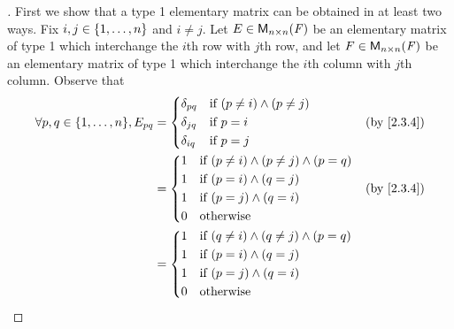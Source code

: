 \begin{proof}[]
  First we show that a type 1 elementary matrix can be obtained in at least two ways.
  Fix \(i, j \in \left\lbrace1, \dots, n\right\rbrace\) and \(i \neq j\).
  Let \(E \in \ms[n][n][\F]\) be an elementary matrix of type 1 which interchange the \(i\)th row with \(j\)th row, and let \(F \in \ms[n][n][\F]\) be an elementary matrix of type 1 which interchange the \(i\)th column with \(j\)th column.
  Observe that
  \begin{align*}
    \forall p, q \in \set{1, \dots, n}, E_{p q} & = \begin{dcases}
                                                      \delta_{p q} & \text{if } (p \neq i) \land (p \neq j) \\
                                                      \delta_{j q} & \text{if } p = i                       \\
                                                      \delta_{i q} & \text{if } p = j
                                                    \end{dcases}    &  & \by{2.3.4}    \\
                                                & = \begin{dcases}
                                                      1 & \text{if } (p \neq i) \land (p \neq j) \land (p = q) \\
                                                      1 & \text{if } (p = i) \land (q = j)                     \\
                                                      1 & \text{if } (p = j) \land (q = i)                     \\
                                                      0 & \text{otherwise}
                                                    \end{dcases} &  & \by{2.3.4} \\
                                                & = \begin{dcases}
                                                      1 & \text{if } (q \neq i) \land (q \neq j) \land (p = q) \\
                                                      1 & \text{if } (p = i) \land (q = j)                     \\
                                                      1 & \text{if } (p = j) \land (q = i)                     \\
                                                      0 & \text{otherwise}

\end{dcases}
\end{align*}
\end{proof}
